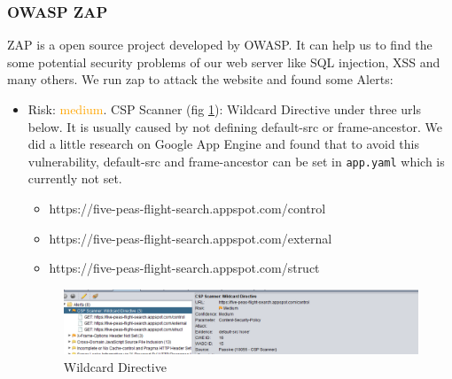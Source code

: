 \documentclass[12pt, a4paper]{article}
\newcommand{\code}[1]{\texttt{#1}}
\begin{document}
\subsubsection{OWASP ZAP}
ZAP is a open source project developed by OWASP. It can help us to find the some potential security problems of our web server like SQL injection, XSS and many others.
We run zap to attack the website and found some Alerts:
\begin{itemize}
    \item Risk: \textcolor{orange}{medium}. CSP Scanner (fig \ref{fig:zap_csp}): Wildcard Directive under three urls below. It is usually caused by not defining default-src or frame-ancestor. We did a little research on Google App Engine and found that to avoid this vulnerability, default-src and frame-ancestor can be set in \code{app.yaml} which is currently not set.
    \begin{itemize}
        \item https://five-peas-flight-search.appspot.com/control
        \item https://five-peas-flight-search.appspot.com/external
        \item https://five-peas-flight-search.appspot.com/struct
    \end{itemize}
    
    \begin{figure}[ht]
    \centering
    \includegraphics[width=\textwidth, frame]{zap_csp.png}
    \caption{Wildcard Directive}
    \label{fig:zap_csp}
    \end{figure}
    

\end{itemize}
\end{document}
